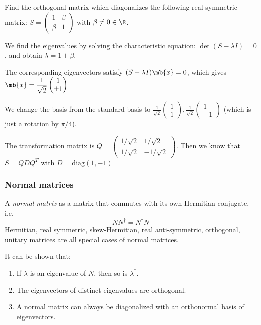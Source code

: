 \documentclass[a4paper]{article}
\begin{document}
\begin{eg}
  Find the orthogonal matrix which diagonalizes the following real symmetric matrix: $S = 
  \begin{pmatrix}
    1 & \beta\\
    \beta & 1
  \end{pmatrix}$ with $\beta \not= 0 \in \R$.

  We find the eigenvalues by solving the characteristic equation: $\det(S - \lambda I) = 0$, and obtain $\lambda = 1\pm \beta$.

  The corresponding eigenvectors satisfy $(S - \lambda I)\mb{x} = 0$, which gives $\displaystyle \mb{x} = \frac{1}{\sqrt{2}}
  \begin{pmatrix}
    1\\
    \pm1
  \end{pmatrix}$

  We change the basis from the standard basis to $
  \displaystyle
  \frac{1}{\sqrt{2}}\begin{pmatrix}
    1\\1
  \end{pmatrix},
  \frac{1}{\sqrt{2}}
  \begin{pmatrix}
    1\\-1
  \end{pmatrix}$ (which is just a rotation by $\pi/4$).

  The transformation matrix is $
  Q = \begin{pmatrix}
    1/\sqrt{2} & 1/\sqrt{2}\\
    1/\sqrt{2} & -1/\sqrt{2}
  \end{pmatrix}$. Then we know that $S = QDQ^T$ with $D = \mathrm{diag}(1, -1)$
\end{eg}
\subsubsection{Normal matrices}
\begin{defi}
  A \emph{normal matrix} as a matrix that commutes with its own Hermitian conjugate, i.e.
  \[
  NN^\dagger = N^\dagger N
  \]
  Hermitian, real symmetric, skew-Hermitian, real anti-symmetric, orthogonal, unitary matrices are all special cases of normal matrices.  
\end{defi}

\begin{prop}
  It can be shown that:
  \begin{enumerate}
  \item If $\lambda$ is an eigenvalue of $N$, then so is $\lambda^*$.
  \item The eigenvectors of distinct eigenvalues are orthogonal.
  \item A normal matrix can always be diagonalized with an orthonormal basis of eigenvectors.
  \end{enumerate}
\end{prop}
\end{document}
